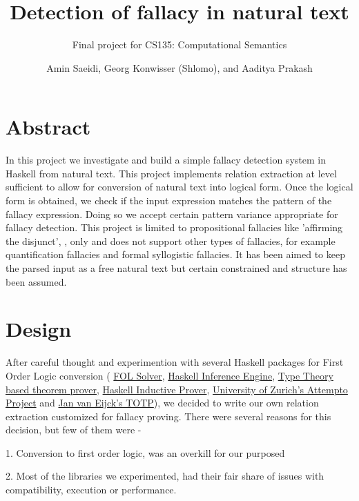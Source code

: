\documentclass[14pt, english]{article}
\date{Amin Saeidi, Georg Konwisser (Shlomo), and Aaditya Prakash}
\begin{document}
\title{Detection of fallacy in natural text}

\author{Final project for CS135: Computational Semantics}

\maketitle

\section{Abstract}

In this project we investigate and build a simple fallacy detection
system in Haskell from natural text. This project implements relation
extraction at level sufficient to allow for conversion of natural
text into logical form. Once the logical form is obtained, we check if the input expression matches the pattern of the fallacy expression. Doing so we accept certain pattern variance appropriate for fallacy detection.
This project is limited to propositional fallacies like 'affirming the disjunct', , only and
does not support other types of fallacies, for example quantification
fallacies and formal syllogistic fallacies. It has been aimed to keep
the parsed input as a free natural text but certain constrained and
structure has been assumed.


\section{Design}

After careful thought and experimention with several Haskell packages
for First Order Logic conversion ( \href{https://github.com/traeger/fol-solver}{FOL Solver},
\href{https://github.com/marcosccm/enki}{Haskell Inference Engine},
\href{https://github.com/edwinb/Ivor}{Type Theory based theorem prover},
\href{https://github.com/danr/hip}{Haskell Inductive Prover}, \href{http://attempto.ifi.uzh.ch/site/}{University of Zurich's Attempto Project}
and \href{http://homepages.cwi.nl/~jve/courses/12/haskellroad/TOTP.pdf}{Jan van Eijck's TOTP}),
we decided to write our own relation extraction customized for fallacy
proving. There were several reasons for this decision, but few of
them were -

1. Conversion to first order logic, was an overkill for our purposed

2. Most of the libraries we experimented, had their fair share of
issues with compatibility, execution or performance.
\end{document}

